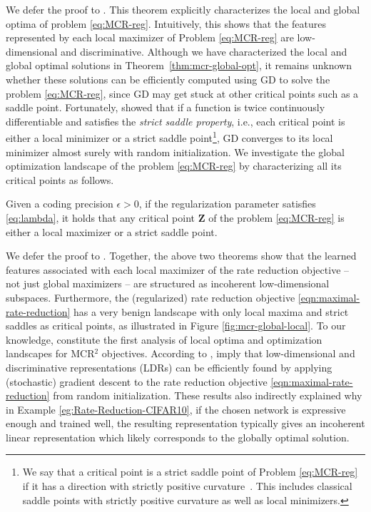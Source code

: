 \documentclass[../../book-main.tex]{subfiles}
\begin{document}
We defer the proof to \cite{wang2024global}. This theorem explicitly characterizes the local and global optima of problem \eqref{eq:MCR-reg}. Intuitively, this shows that the features represented by each local maximizer of Problem \eqref{eq:MCR-reg} are low-dimensional and discriminative. Although we have characterized the local and global optimal solutions in Theorem~\ref{thm:mcr-global-opt}, it remains unknown whether these solutions can be efficiently computed using GD to solve the problem \eqref{eq:MCR-reg}, since GD may get stuck at other critical points such as a saddle point.
Fortunately, \cite{sun2015nonconvex,lee2016gradient} showed that if a function is twice continuously differentiable and satisfies the {\em strict saddle property}, i.e., each critical point is either a local minimizer or a strict saddle point\footnote{We say that a critical point is a strict saddle point of Problem \eqref{eq:MCR-reg} if it has a direction with strictly positive curvature~\cite{sun2015nonconvex}. This includes classical saddle points with strictly positive curvature as well as local minimizers.}, GD converges to its local minimizer almost surely with random initialization. We investigate the global optimization landscape of the problem \eqref{eq:MCR-reg} by characterizing all its critical points as follows.

\begin{theorem}\label{thm:mcr-benign-opt-landscape}
	Given a coding precision $\epsilon > 0$, if the regularization parameter satisfies \eqref{eq:lambda},
	it holds that any critical point $\bm Z$ of the problem \eqref{eq:MCR-reg} is either a local maximizer or a strict saddle point.
\end{theorem}
We defer the proof to \cite{wang2024global}.  Together, the above two theorems show that the learned features associated with each local maximizer of the rate reduction objective -- not just global maximizers -- are structured as incoherent low-dimensional subspaces. Furthermore, the (regularized) rate reduction objective \eqref{eqn:maximal-rate-reduction} has a very benign landscape with only local maxima and strict saddles as critical points, as illustrated in Figure \ref{fig:mcr-global-local}. To our knowledge,  constitute the first analysis of local optima and optimization landscapes for MCR$^2$ objectives. According to \cite{sun2015nonconvex,lee2016gradient},  imply that low-dimensional and discriminative representations (LDRs) can be efficiently found by applying (stochastic) gradient descent to the rate reduction objective \eqref{eqn:maximal-rate-reduction} from random initialization. These results also indirectly explained why in Example \ref{eg:Rate-Reduction-CIFAR10}, if the chosen network is expressive enough and trained well, the resulting representation typically gives an incoherent linear representation which likely corresponds to the globally optimal solution.
\end{document}
